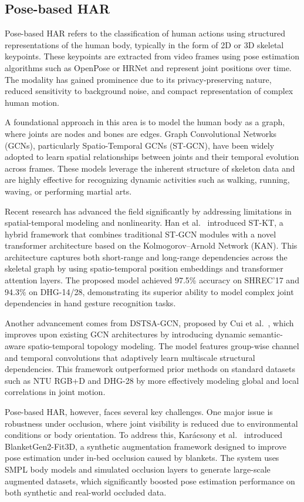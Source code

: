 \subsection{Pose-based HAR}
Pose-based HAR refers to the classification of human actions using structured representations of the human body, typically in the form of 2D or 3D skeletal keypoints. These keypoints are extracted from video frames using pose estimation algorithms such as OpenPose or HRNet and represent joint positions over time. The modality has gained prominence due to its privacy-preserving nature, reduced sensitivity to background noise, and compact representation of complex human motion.

A foundational approach in this area is to model the human body as a graph, where joints are nodes and bones are edges. Graph Convolutional Networks (GCNs), particularly Spatio-Temporal GCNs (ST-GCN), have been widely adopted to learn spatial relationships between joints and their temporal evolution across frames. These models leverage the inherent structure of skeleton data and are highly effective for recognizing dynamic activities such as walking, running, waving, or performing martial arts.

Recent research has advanced the field significantly by addressing limitations in spatial-temporal modeling and nonlinearity. Han et al.~\cite{han2025spatio} introduced ST-KT, a hybrid framework that combines traditional ST-GCN modules with a novel transformer architecture based on the Kolmogorov–Arnold Network (KAN). This architecture captures both short-range and long-range dependencies across the skeletal graph by using spatio-temporal position embeddings and transformer attention layers. The proposed model achieved 97.5\% accuracy on SHREC’17 and 94.3\% on DHG-14/28, demonstrating its superior ability to model complex joint dependencies in hand gesture recognition tasks.

Another advancement comes from DSTSA-GCN, proposed by Cui et al.~\cite{cui2025dstsa}, which improves upon existing GCN architectures by introducing dynamic semantic-aware spatio-temporal topology modeling. The model features group-wise channel and temporal convolutions that adaptively learn multiscale structural dependencies. This framework outperformed prior methods on standard datasets such as NTU RGB+D and DHG-28 by more effectively modeling global and local correlations in joint motion.

Pose-based HAR, however, faces several key challenges. One major issue is robustness under occlusion, where joint visibility is reduced due to environmental conditions or body orientation. To address this, Karácsony et al.~\cite{karacsony2025blanketgen2} introduced BlanketGen2-Fit3D, a synthetic augmentation framework designed to improve pose estimation under in-bed occlusion caused by blankets. The system uses SMPL body models and simulated occlusion layers to generate large-scale augmented datasets, which significantly boosted pose estimation performance on both synthetic and real-world occluded data.

